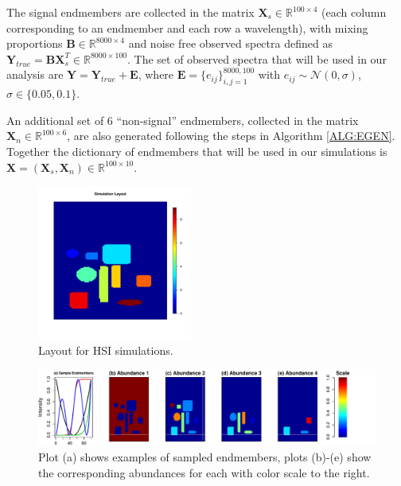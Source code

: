 \documentclass{article}
\numberwithin{equation}{section}
\theoremstyle{plain}
\begin{document}
The signal endmembers are collected in the matrix $\mathbf{X}_s \in
\mathbb{R}^{100 \times 4}$ (each column corresponding to an endmember and each
row a wavelength), with mixing proportions $\mathbf{B} \in \mathbb{R}^{8000
\times 4}$ and noise free observed spectra defined as $\mathbf{Y}_{true} =
\mathbf{B} \mathbf{X}_s^T \in \mathbb{R}^{8000 \times 100}$.
The set of observed spectra that will be used in our analysis are $\mathbf{Y} =
\mathbf{Y}_{true} + \mathbf{E}$, where $\mathbf{E} = \{e_{ij}\}_{i,j=1}^{8000,
100}$ with $e_{ij} \sim \mathcal{N}(0, \sigma)$, $\sigma \in \{0.05, 0.1\}$.



An additional set of 6 ``non-signal'' endmembers, collected in the matrix
$\mathbf{X}_n \in \mathbb{R}^{100 \times 6}$, are also generated following the
steps in Algorithm \ref{ALG:EGEN}.
Together the dictionary of endmembers that will be used in our simulations is
$\mathbf{X} = (\mathbf{X}_s, \mathbf{X}_n) \in \mathbb{R}^{100\times 10}$. 
\begin{figure}
\begin{center}
\includegraphics[width = 2.0in]{hsi.pdf}
\caption{Layout for HSI simulations.}
\label{FIG:HSI_IMG}
\end{center}
\end{figure}
 
\begin{figure}
\begin{center}
\includegraphics[width = 6.5in]{spec_sim2.pdf}
\caption{Plot (a) shows examples of sampled endmembers, plots (b)-(e) show
the corresponding abundances for each with color scale to the right.}
\label{FIG:MIX}
\end{center}
\end{figure}
\end{document}
